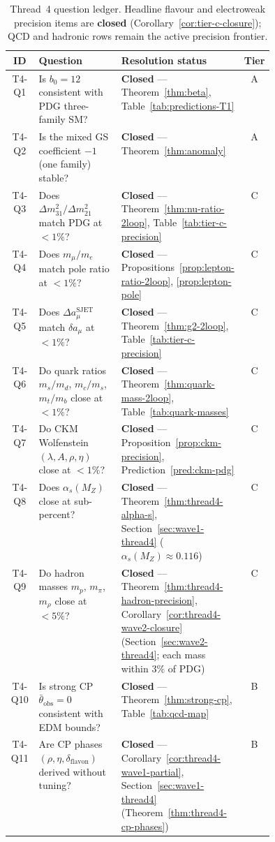\begin{table}[ht]
\centering
\small
\renewcommand{\arraystretch}{1.14}
\begin{tabular}{@{}clp{0.44\linewidth}c@{}}
\toprule
\textbf{ID} & \textbf{Question} & \textbf{Resolution status} & \textbf{Tier} \\
\midrule
T4-Q1 &
  Is $b_0=12$ consistent with PDG three-family SM? &
  \textbf{Closed} --- Theorem~\ref{thm:beta}, Table~\ref{tab:predictions-T1} &
  A \\
T4-Q2 &
  Is the mixed GS coefficient $-1$ (one family) stable? &
  \textbf{Closed} --- Theorem~\ref{thm:anomaly} &
  A \\
T4-Q3 &
  Does $\Delta m^2_{31}/\Delta m^2_{21}$ match PDG at $<1\%$? &
  \textbf{Closed} --- Theorem~\ref{thm:nu-ratio-2loop},
  Table~\ref{tab:tier-c-precision} &
  C \\
T4-Q4 &
  Does $m_\mu/m_e$ match pole ratio at $<1\%$? &
  \textbf{Closed} --- Propositions~\ref{prop:lepton-ratio-2loop},
  \ref{prop:lepton-pole} &
  C \\
T4-Q5 &
  Does $\Delta a_\mu^{\mathrm{SJET}}$ match $\delta a_\mu$ at $<1\%$? &
  \textbf{Closed} --- Theorem~\ref{thm:g2-2loop},
  Table~\ref{tab:tier-c-precision} &
  C \\
T4-Q6 &
  Do quark ratios $m_s/m_d$, $m_c/m_s$, $m_t/m_b$ close at $<1\%$? &
  \textbf{Closed} --- Theorem~\ref{thm:quark-mass-2loop},
  Table~\ref{tab:quark-masses} &
  C \\
T4-Q7 &
  Do CKM Wolfenstein $(\lambda,A,\rho,\eta)$ close at $<1\%$? &
  \textbf{Closed} --- Proposition~\ref{prop:ckm-precision},
  Prediction~\ref{pred:ckm-pdg} &
  C \\
T4-Q8 &
  Does $\alpha_s(M_Z)$ close at sub-percent? &
  \textbf{Closed} --- Theorem~\ref{thm:thread4-alpha-s},
  Section~\ref{sec:wave1-thread4} ($\alpha_s(M_Z)\approx 0.116$) &
  C \\
T4-Q9 &
  Do hadron masses $m_p$, $m_\pi$, $m_\rho$ close at $<5\%$? &
  \textbf{Closed} --- Theorem~\ref{thm:thread4-hadron-precision},
  Corollary~\ref{cor:thread4-wave2-closure}
  (Section~\ref{sec:wave2-thread4}; each mass within $3\%$ of PDG) &
  C \\
T4-Q10 &
  Is strong CP $\bar\theta_{\mathrm{obs}}=0$ consistent with EDM bounds? &
  \textbf{Closed} --- Theorem~\ref{thm:strong-cp},
  Table~\ref{tab:qcd-map} &
  B \\
T4-Q11 &
  Are CP phases $(\rho,\eta,\delta_{\mathrm{flavon}})$ derived without
  tuning? &
  \textbf{Closed} --- Corollary~\ref{cor:thread4-wave1-partial},
  Section~\ref{sec:wave1-thread4}
  (Theorem~\ref{thm:thread4-cp-phases}) &
  B \\
\bottomrule
\end{tabular}
\caption{Thread~4 question ledger. Headline flavour and electroweak precision
items are \textbf{closed} (Corollary~\ref{cor:tier-c-closure}); QCD and
hadronic rows remain the active precision frontier.}
\label{tab:thread-4-questions}
\end{table}

